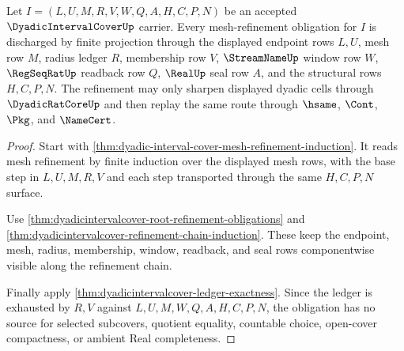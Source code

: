 \begin{theorem}
\label{thm:dyadicintervalcover-mesh-refinement-obligation}
Let $I=(L,U,M,R,V,W,Q,A,H,C,P,N)$ be an accepted $\DyadicIntervalCoverUp$ carrier. Every mesh-refinement obligation for $I$ is discharged by finite projection through the displayed endpoint rows $L,U$, mesh row $M$, radius ledger $R$, membership row $V$, $\StreamNameUp$ window row $W$, $\RegSeqRatUp$ readback row $Q$, $\RealUp$ seal row $A$, and the structural rows $H,C,P,N$. The refinement may only sharpen displayed dyadic cells through $\DyadicRatCoreUp$ and then replay the same route through $\hsame$, $\Cont$, $\Pkg$, and $\NameCert$.
\end{theorem}
\begin{proof}
Start with \autoref{thm:dyadic-interval-cover-mesh-refinement-induction}. It reads mesh refinement by finite induction over the displayed mesh rows, with the base step in $L,U,M,R,V$ and each step transported through the same $H,C,P,N$ surface.

Use \autoref{thm:dyadicintervalcover-root-refinement-obligations} and \autoref{thm:dyadicintervalcover-refinement-chain-induction}. These keep the endpoint, mesh, radius, membership, window, readback, and seal rows componentwise visible along the refinement chain.

Finally apply \autoref{thm:dyadicintervalcover-ledger-exactness}. Since the ledger is exhausted by $R,V$ against $L,U,M,W,Q,A,H,C,P,N$, the obligation has no source for selected subcovers, quotient equality, countable choice, open-cover compactness, or ambient Real completeness.
\end{proof}

